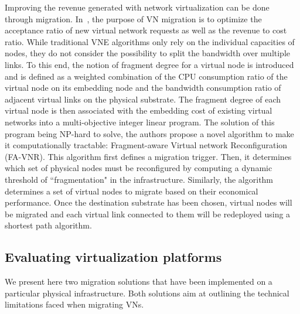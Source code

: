 Improving the revenue generated with network virtualization can be done through migration.
In~\cite{fragment-Liu2018}, the purpose of VN migration is to optimize the acceptance ratio of new virtual network requests as well as the revenue to cost ratio.
While traditional VNE algorithms only rely on the individual capacities of nodes, they do not consider the possibility to split the bandwidth over multiple links.
To this end, the notion of fragment degree for a virtual node is introduced and is defined as a weighted combination of the CPU consumption ratio of the virtual node on its embedding node and the bandwidth consumption ratio of adjacent virtual links on the physical substrate.
The fragment degree of each virtual node is then associated with the embedding cost of existing virtual networks into a multi-objective integer linear program. The solution of this program being NP-hard to solve, the authors propose a novel algorithm to make it computationally tractable: Fragment-aware Virtual network Reconfiguration (FA-VNR).
This algorithm first defines a migration trigger. 
Then, it determines which set of physical nodes must be reconfigured by computing a dynamic threshold of ``fragmentation" in the infrastructure.
Similarly, the algorithm determines a set of virtual nodes to migrate based on their economical performance.
Once the destination substrate has been chosen, virtual nodes will be migrated and each virtual link connected to them will be redeployed using a shortest path algorithm.

\subsection{Evaluating virtualization platforms}
We present here two migration solutions that have been implemented on a particular physical infrastructure.
Both solutions aim at outlining the technical limitations faced when migrating VNs.

